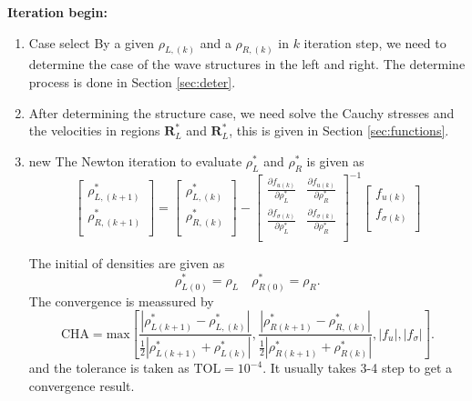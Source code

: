 \documentclass[review]{elsarticle}
\begin{document}
\textbf{Iteration begin:}
\begin{enumerate}[Step 1]
  \item Case select
	By a given  $\rho _{L,(k)}$ and a  $\rho _{R,(k)}$ in $k$ iteration step, we need to determine the case of the wave structures in the left and right. The determine process is done in Section \ref{sec:deter}.

  \item After determining the structure case, we need solve the Cauchy stresses and the velocities in regions $\mathbf{R}^*_L$ and $\mathbf{R}^*_L$, this is given in Section \ref{sec:functions}.

  \item  new 
The Newton iteration to evaluate $\rho_L^*$ and $\rho_R^*$ is given as
\begin{equation}
\left[ \begin{array}{l}
 \rho _{L,(k+1)}^*\\
\rho_{R,(k+1)}^*\\
\end{array}
\right] = 
\left[ \begin{array}{l}
 \rho _{L,(k)}^*\\
\rho_{R,(k)}^*\\
\end{array}
\right]-
\left[ \begin{array}{ll}
\frac{\partial f_{u(k)}}{\partial \rho_L^*} & \frac{\partial f_{u(k)}}{\partial \rho_R^*}\\
\frac{\partial f_{\sigma(k)}}{\partial \rho_L^*} & \frac{\partial f_{\sigma(k)}}{\partial \rho_R^*}\\
\end{array}
\right]^{-1}
\left[ \begin{array}{l}
f_{u(k)}\\
f_{\sigma(k)}\\
\end{array}
\right]
\end{equation}

The initial of densities are given as 
\begin{equation}
  \rho_{L(0)}^* = \rho_L \quad \rho_{R(0)}^* = \rho_R.
\end{equation}
The  convergence is meassured by 
\begin{equation}
\text{CHA} = \text{max} \left[  
\frac{|\rho_{L(k+1)}^*- \rho_{L,(k)}^*|}{\frac{1}{2}|\rho_{L(k+1)}^*+\rho_{L(k)}^*|},   \frac{|\rho_{R(k+1)}^*- \rho_{R,(k)}^*|}{\frac{1}{2}|\rho_{R(k+1)}^*+\rho_{R(k)}^*|},|f_{u}|,|f_{\sigma}|\right].
\end{equation}
and the tolerance is taken as $\text{TOL} = 10^{-4}$. It usually takes 3-4 step to get a convergence result.


\end{enumerate}
\end{document}

